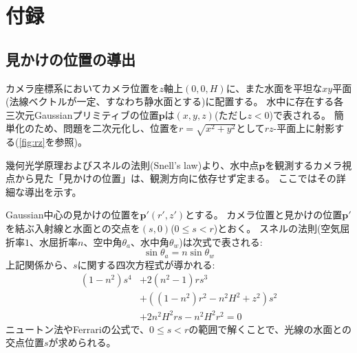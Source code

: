 \chapter{付録}

\section{見かけの位置の導出}\label{sec:appendix-apparent-depth}

カメラ座標系においてカメラ位置を$z$軸上$\left(0, 0, H\right)$に、また水面を平坦な$xy$平面(法線ベクトルが一定、すなわち静水面とする)に配置する。
水中に存在する各三次元Gaussianプリミティブの位置$\bm{p}$は$\left(x, y, z\right)$(ただし$z<0$)で表される。
簡単化のため、問題を二次元化し、位置を$r = \sqrt{x^2 + y^2}$として$rz$-平面上に射影する(\cref{fig:rz}を参照)。

幾何光学原理およびスネルの法則(Snell's law)より、水中点$\bm{p}$を観測するカメラ視点から見た「見かけの位置」は、観測方向に依存せず定まる\cite{nassar1994_ApparentDepth,Missailidis2025_apparentDepth-leading}。
ここではその詳細な導出を示す。

Gaussian中心の見かけの位置を$\bm{p}'(r', z')$とする。
カメラ位置と見かけの位置$\bm{p}'$を結ぶ入射線と水面との交点を$(s, 0)$($0 \leq s < r$)とおく。
スネルの法則(空気屈折率$1$、水屈折率$n$、空中角$\theta_a$、水中角$\theta_w$)は次式で表される:
\begin{equation}\label{eq:-snell}
  \sin \theta_a = n \sin \theta_w
\end{equation}
上記関係から、$s$に関する四次方程式が導かれる:
\begin{equation}\label{eq:-quartic-s}
\begin{split}
  (1-n^2)s^4 &+ 2(n^2-1)rs^3 \\
  &+ ((1-n^2)r^2 - n^2H^2 + z^2)s^2 \\
  &+ 2n^2H^2rs - n^2H^2r^2 = 0
\end{split}
\end{equation}
ニュートン法やFerrariの公式で、$0 \leq s < r$の範囲で解くことで、光線の水面との交点位置$s$が求められる。

